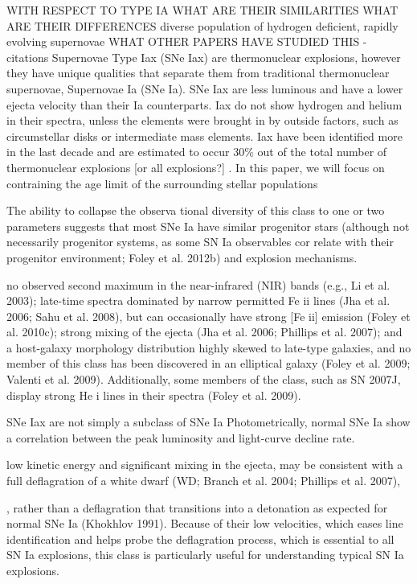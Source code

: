 \documentclass[preprint2]{aastex}
\begin{document}
WITH RESPECT TO TYPE IA
WHAT ARE THEIR SIMILARITIES
WHAT ARE THEIR DIFFERENCES
diverse population of hydrogen
deficient, rapidly evolving supernovae
WHAT OTHER PAPERS HAVE STUDIED THIS - citations
Supernovae Type Iax (SNe Iax) are thermonuclear explosions, however they have
 unique qualities that separate them from traditional thermonuclear supernovae,
 Supernovae Ia (SNe Ia). SNe Iax are less luminous and have a lower ejecta velocity
than their Ia counterparts. Iax do not show hydrogen and helium in their spectra,
 unless the elements were brought in by outside factors, such as circumstellar disks or
 intermediate mass elements. Iax have been identified more in the last decade and are
estimated to occur 30$\%$ out of the total number of thermonuclear explosions 
[or all explosions?] . In this paper, we will focus on contraining the age limit of the
surrounding stellar populations

 The ability to collapse the observa
tional diversity of this class to one or two parameters suggests
that most SNe Ia have similar progenitor stars (although not
necessarily progenitor systems, as some SN Ia observables cor
relate with their progenitor environment;  Foley et al. 2012b)
and explosion mechanisms. 

no observed second maximum in
the near-infrared (NIR) bands (e.g., Li et al. 2003); late-time
spectra dominated by narrow permitted Fe ii lines (Jha et al.
2006; Sahu et al. 2008), but can occasionally have strong [Fe ii]
emission (Foley et al. 2010c); strong mixing of the ejecta (Jha
et al. 2006; Phillips et al. 2007); and a host-galaxy morphology
distribution highly skewed to late-type galaxies, and no member
of this class has been discovered in an elliptical galaxy (Foley
et al. 2009; Valenti et al. 2009). Additionally, some members of
the class, such as SN 2007J, display strong He i lines in their
spectra (Foley et al. 2009).

SNe Iax are not simply a subclass of SNe Ia
Photometrically, normal SNe Ia show a correlation between
the peak luminosity and light-curve decline rate.

 low kinetic energy and significant mixing
in the ejecta, may be consistent with a full deflagration of a white
dwarf (WD; Branch et al. 2004; Phillips et al. 2007),



, rather than
a deflagration that transitions into a detonation as expected for
normal SNe Ia (Khokhlov 1991). Because of their low velocities,
which eases line identification and helps probe the deflagration
process, which is essential to all SN Ia explosions, this class is
particularly useful for understanding typical SN Ia explosions.
\end{document}
